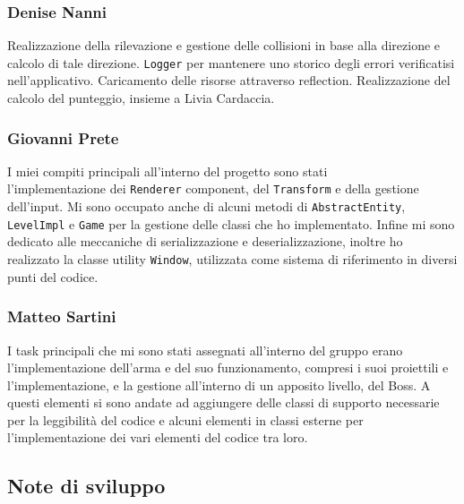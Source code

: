 \documentclass{article}
\begin{document}
\subsubsection{Denise Nanni}
Realizzazione della rilevazione e gestione delle collisioni in base alla direzione e calcolo di tale direzione.
\texttt{Logger} per mantenere uno storico degli errori verificatisi nell'applicativo.
Caricamento delle risorse attraverso reflection.
Realizzazione del calcolo del punteggio, insieme a Livia Cardaccia.

\subsubsection{Giovanni Prete}
I miei compiti principali all'interno del progetto sono stati\\
l'implementazione dei \texttt{Renderer} component, del \texttt{Transform} e della gestione dell'input. Mi sono occupato anche di alcuni metodi di \texttt{AbstractEntity}, \texttt{LevelImpl} e \texttt{Game} per la gestione delle classi che ho implementato. Infine mi sono dedicato alle meccaniche di serializzazione e deserializzazione, inoltre ho realizzato la classe utility \texttt{Window}, utilizzata come sistema di riferimento in diversi punti del codice.

\subsubsection{Matteo Sartini}
I task principali che mi sono stati assegnati all’interno del gruppo erano l’implementazione dell’arma e del suo funzionamento, compresi i suoi proiettili e l’implementazione, e la gestione all’interno di un apposito livello, del Boss. A questi elementi si sono andate ad aggiungere delle classi di supporto necessarie per la leggibilità del codice e alcuni elementi in classi esterne per l’implementazione dei vari elementi del codice tra loro.

\newpage
\subsection{Note di sviluppo}
\end{document}
